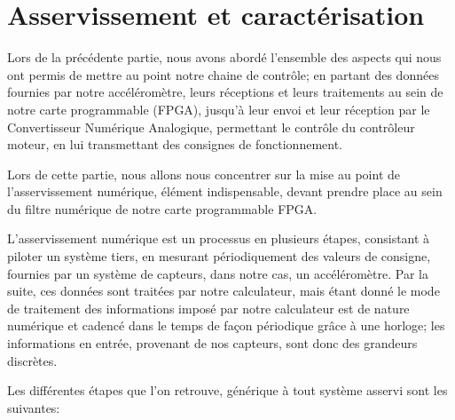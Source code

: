 \documentclass[french,a4paper,12pt]{report}
\begin{document}
%
%
	\part{Asservissement et caractérisation}
	
	Lors de la précédente partie, nous avons abordé l'ensemble des aspects qui nous ont permis de mettre au point notre chaine de contrôle; en partant des données fournies par notre accéléromètre, leurs réceptions et leurs traitements au sein de notre carte programmable (FPGA), jusqu'à leur envoi et leur réception par le Convertisseur Numérique Analogique, permettant le contrôle du contrôleur moteur, en lui transmettant des consignes de fonctionnement.
	
	Lors de cette partie, nous allons nous concentrer sur la mise au point de l'asservissement numérique, élément indispensable, devant prendre place au sein du filtre numérique de notre carte programmable FPGA.
	
	L'asservissement numérique est un processus en plusieurs étapes, consistant à piloter un système tiers, en mesurant périodiquement des valeurs de consigne, fournies par un système de capteurs, dans notre cas, un accéléromètre. 
	Par la suite, ces données sont traitées par notre calculateur, mais étant donné le mode de traitement des informations imposé par notre calculateur est de nature numérique et cadencé dans le temps de façon périodique grâce à une horloge; les informations en entrée, provenant de nos capteurs, sont donc des grandeurs discrètes.
	
	Les différentes étapes que l'on retrouve,  générique à tout système asservi sont les suivantes:
	
\end{document}
